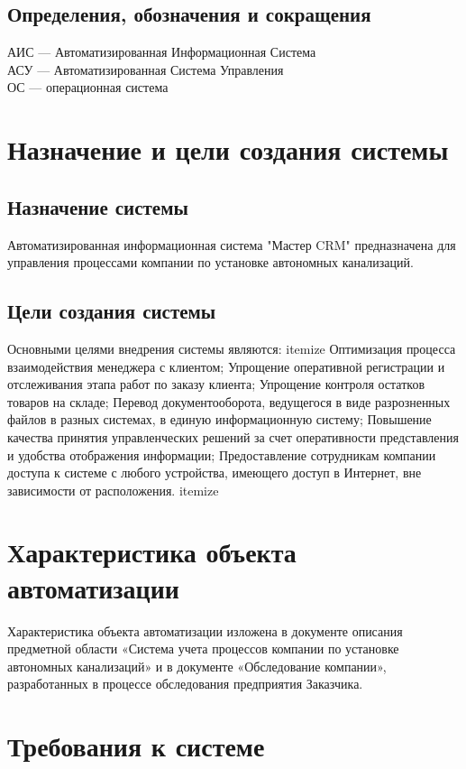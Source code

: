 \documentclass[russian, utf8, 12pt,pointsubsection,floatsubsection]{eskdtext}
\begin{document}
\subsection{Определения, обозначения и сокращения}
АИС --- Автоматизированная Информационная Система\\
АСУ --- Автоматизированная Система Управления\\
ОС --- операционная система

\section{Назначение и цели создания системы}

\subsection{Назначение системы}
Автоматизированная информационная система "Мастер CRM" предназначена для управления процессами компании по установке автономных канализаций.

\subsection{Цели создания системы}
Основными целями внедрения системы являются:
itemize
Оптимизация процесса взаимодействия менеджера с клиентом;
Упрощение оперативной регистрации и отслеживания этапа работ по заказу клиента;
Упрощение контроля остатков товаров на складе;
Перевод документооборота, ведущегося в виде разрозненных файлов в разных системах, в единую информационную систему;
Повышение качества принятия управленческих решений за счет оперативности представления и удобства отображения информации;
Предоставление сотрудникам компании доступа к системе с любого устройства, имеющего доступ в Интернет, вне зависимости от расположения.
itemize

\section{Характеристика объекта автоматизации}

Характеристика объекта автоматизации изложена в документе описания предметной области «Система учета процессов компании по установке автономных канализаций» и в документе «Обследование компании», разработанных в процессе обследования предприятия Заказчика.

\section{Требования к системе}
\end{document}
